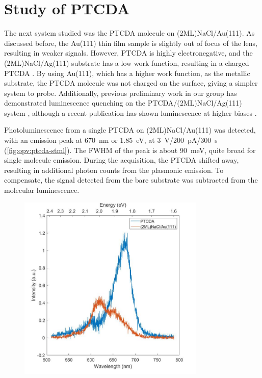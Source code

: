 \section{Study of PTCDA}

The next system studied was the \ac{PTCDA} molecule on (2ML)NaCl/Au(111). As discussed before, the Au(111) thin film sample is slightly out of focus of the lens, resulting in weaker signals. However, \ac{PTCDA} is highly electronegative, and the (2ML)NaCl/Ag(111) substrate has a low work function, resulting in a charged PTCDA \citep{cochrane2017single,cochrane2018molecularly}. By using Au(111), which has a higher work function, as the metallic substrate, the PTCDA molecule was not charged on the surface, giving a simpler system to probe. Additionally, previous preliminary work in our group has demonstrated luminescence quenching on the PTCDA/(2ML)NaCl/Ag(111) system \citep{roussy2016coupling}, although a recent publication has shown luminescence at higher biases \citep{Kimura2019}.

Photoluminescence from a single PTCDA on (2ML)NaCl/Au(111) was detected, with an emission peak at \SI{670}{nm} or \SI{1.85}{eV}, at \SI{3}{V}/\SI{200}{pA}/\SI{300}{s} (\autoref{fig:opv:ptcda-stml}). The \ac{FWHM} of the peak is about \SI{90}{meV}, quite broad for single molecule emission. During the acquisition, the PTCDA shifted away, resulting in additional photon counts from the plasmonic emission. To compensate, the signal detected from the bare substrate was subtracted from the molecular luminescence.


\begin{figure} [h]
    \centering
        \includegraphics[width=3.5in]{pictures/ptcda_subtract_pl_3V_200pA_300s.jpg}
    \caption{}
    \label{fig:opv:ptcda-stml}
\end{figure}

